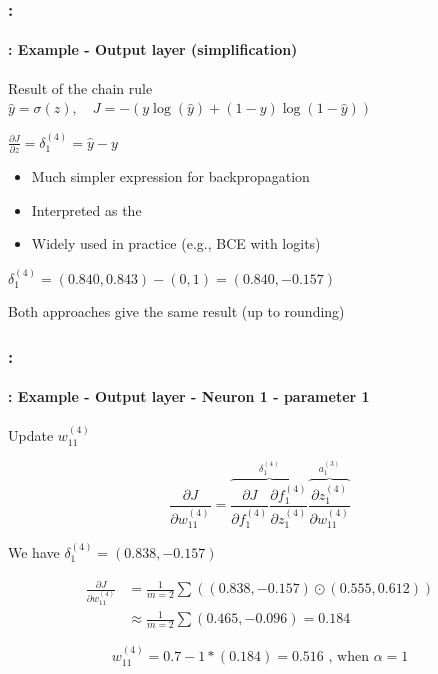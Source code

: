 \documentclass[xcolor=table]{beamer}
\begin{document}
\begin{frame}
	\frametitle{\insertshortsubtitle: \insertsection}
	\framesubtitle{\insertsubsection: Example - Output layer (simplification)}
	
	\begin{exampleblock}{Result of the chain rule}
		\centering
		$\hat{y} = \sigma(z), \quad
		J = - (y \log(\hat{y}) + (1-y)\log(1-\hat{y}))$
		
		$\frac{\partial J}{\partial z} = \delta_{1}^{(4)} = \hat{y} - y$
	\end{exampleblock}
	
	\begin{itemize}
		\item Much simpler expression for backpropagation
		\item Interpreted as the 
		\item Widely used in practice (e.g., BCE with logits)
	\end{itemize}
	
	$
	\delta_{1}^{(4)} = (0.840, 0.843) - (0, 1) = (0.840, -0.157)
	$
	
	Both approaches give the same result (up to rounding)
	
\end{frame}


\begin{frame}
	\frametitle{\insertshortsubtitle: \insertsection}
	\framesubtitle{\insertsubsection: Example - Output layer - Neuron 1 - parameter 1}
	
	Update $w_{11}^{(4)}$
	
	
	\[
	\frac{\partial J}{\partial w_{11}^{(4)}} = \overbrace{\frac{\partial J}{\partial f_{1}^{(4)}} \frac{\partial f_{1}^{(4)}}{\partial z_{1}^{(4)}}}^{\delta_{1}^{(4)}} \overbrace{\frac{\partial z_{1}^{(4)}}{\partial w_{11}^{(4)}}}^{a_{1}^{(3)}}
	\]
	
	We have $\delta_{1}^{(4)} = (0.838, -0.157)$
	
	\begin{align*}
		\frac{\partial J}{\partial w_{11}^{(4)}} & = \frac{1}{m=2} \sum ((0.838, -0.157) \odot (0.555, 0.612))  \\
		& \approx \frac{1}{m=2} \sum (0.465, -0.096) = 0.184
	\end{align*}
	
	
	\[
	w_{11}^{(4)} = 0.7 - 1 * (0.184) = 0.516 \text{ , when } \alpha = 1
	\]
	
\end{frame}
\end{document}
